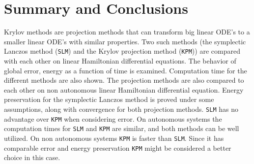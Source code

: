 \section*{Summary and Conclusions}
Krylov methods are projection methods that can transform big linear ODE's to a smaller linear ODE's with similar properties. 
Two such methods (the symplectic Lanczos method (\texttt{SLM}) and the Krylov projection method (\texttt{KPM})) are compared with each other on linear Hamiltonian differential equations. The behavior of global error, energy as a function of time is examined. Computation time for the different methods are also shown. The projection methods are also compared to each other on non autonomous linear Hamiltonian differential equation.
Energy preservation for the symplectic Lanczos method is proved under some assumptions, along with convergence for both projection methods. \texttt{SLM} has no advantage over \texttt{KPM} when considering error. On autonomous systems the computation times for \texttt{SLM} and \texttt{KPM} are similar, and both methods can be well utilized. On non autonomous systems \texttt{KPM} is faster than \texttt{SLM}. Since it has comparable error and energy preservation \texttt{KPM} might be considered a better choice in this case.


